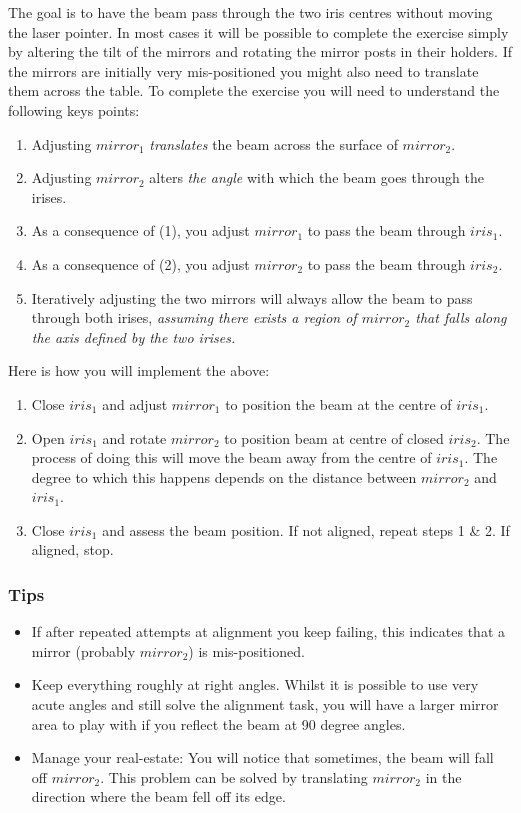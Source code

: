 \documentclass[a4paper]{report}
\begin{document}
The goal is to have the beam pass through the two iris centres without moving the laser pointer. 
In most cases it will be possible to complete the exercise simply by altering the tilt of the mirrors and rotating the mirror posts in their holders. 
If the mirrors are initially very mis-positioned you might also need to translate them across the table. 
To complete the exercise you will need to understand the following keys points:

\begin{enumerate}
\item Adjusting $mirror_1$ \textit{translates} the beam across the surface of $mirror_2$.
\item Adjusting $mirror_2$ alters \textit{the angle} with which the beam goes through the irises. 
\item As a consequence of (1), you adjust $mirror_1$ to pass the beam through $iris_1$.
\item As a consequence of (2), you adjust $mirror_2$ to pass the beam through $iris_2$.
\item Iteratively adjusting the two mirrors will always allow the beam to pass through both irises, \textit{assuming there exists a region of $mirror_2$ that falls along the axis defined by the two irises.} 
\end{enumerate}

\clearpage
Here is how you will implement the above:

\begin{enumerate}
\item Close $iris_1$ and adjust $mirror_1$ to position the beam at the centre of $iris_1$.
\item Open $iris_1$ and rotate $mirror_2$ to position beam at centre of closed $iris_2$. 
The process of doing this will move the beam away from the centre of $iris_1$. 
The degree to which this happens depends on the distance between $mirror_2$ and $iris_1$.
\item Close $iris_1$ and assess the beam position. If not aligned, repeat steps 1 \& 2. 
If aligned, stop. 
\end{enumerate}

\subsubsection{Tips}
\begin{itemize}
\item If after repeated attempts at alignment you keep failing, this indicates that a mirror (probably $mirror_2$) is mis-positioned. 
\item Keep everything roughly at right angles. 
      Whilst it is possible to use very acute angles and still solve the alignment task, you will have a larger mirror area to play with if you reflect the beam at 90 degree angles.
\item Manage your real-estate: You will notice that sometimes, the beam will fall off $mirror_2$. 
      This problem can be solved by translating $mirror_2$ in the direction where the beam fell off its edge.
\end{itemize}
\end{document}
